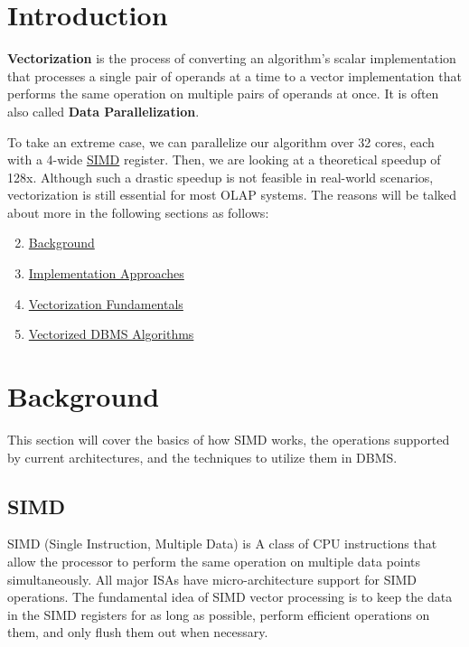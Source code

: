 \documentclass[11pt]{article}
\begin{document}
\maketitle
\thispagestyle{plain}

\section{Introduction}
\textbf{Vectorization} is the process of converting an algorithm's scalar implementation that processes a single pair of operands at a time to a vector implementation that performs the same operation on multiple pairs of operands at once. It is often also called \textbf{Data Parallelization}. 

To take an extreme case, we can parallelize our algorithm over 32 cores, each with a 4-wide \hyperref[simd]{SIMD} register. Then, we are looking at a theoretical speedup of 128x. Although such a drastic speedup is not feasible in real-world scenarios, vectorization is still essential for most OLAP systems.
The reasons will be talked about more in the following sections as follows:
\begin{enumerate}
  \setcounter{enumi}{1}
    \item \hyperref[back]{Background}
    \item \hyperref[impl]{Implementation Approaches}
    \item \hyperref[fund]{Vectorization Fundamentals}
    \item \hyperref[algo]{Vectorized DBMS Algorithms}
\end{enumerate}


\section{Background}

This section will cover the basics of how SIMD works, the operations supported by current architectures, and the techniques to utilize them in DBMS.

\label{back}
\subsection{SIMD}
 \label{simd}
SIMD (Single Instruction, Multiple Data) is A class of CPU instructions that allow the processor to perform the same operation on multiple data points simultaneously. All major ISAs have micro-architecture support for SIMD operations. The fundamental idea of SIMD vector processing is to keep the data in the SIMD registers for as long as possible, perform efficient operations on them, and only flush them out when necessary.
\end{document}
